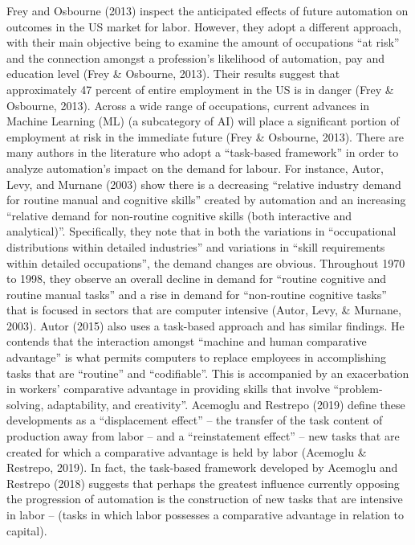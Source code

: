 \documentclass[12pt]{article}
\begin{document}
\begin{flushleft}
\break
\linebreak
Frey and Osbourne (2013) inspect the anticipated effects of future automation on outcomes in the US market for labor. However, they adopt a different approach, with their main objective being to examine the amount of occupations ``at risk” and the connection amongst a profession's likelihood of automation, pay and education level (Frey \& Osbourne, 2013). Their results suggest that approximately 47 percent of entire employment in the US is in danger (Frey \& Osbourne, 2013). Across a wide range of occupations, current advances in Machine Learning (ML) (a subcategory of AI) will place a significant portion of employment at risk in the immediate future (Frey \& Osbourne, 2013).
\break
\linebreak
There are many authors in the literature who adopt a ``task-based framework” in order to analyze automation’s impact on the demand for labour. For instance, Autor, Levy, and Murnane (2003) show there is a decreasing ``relative industry demand for routine manual and cognitive skills” created by automation and an increasing ``relative demand for non-routine cognitive skills (both interactive and analytical)”. Specifically, they note that in both the variations in ``occupational distributions within detailed industries” and variations in ``skill requirements within detailed occupations”, the demand changes are obvious. Throughout 1970 to 1998, they observe an overall decline in demand for ``routine cognitive and routine manual tasks” and a rise in demand for ``non-routine cognitive tasks” that is focused in sectors that are computer intensive (Autor, Levy, \& Murnane, 2003).
\break
\linebreak
Autor (2015) also uses a task-based approach and has similar findings. He contends that the interaction amongst ``machine and human comparative advantage” is what permits computers to replace employees in accomplishing tasks that are “routine” and ``codifiable”. This is accompanied by an exacerbation in workers’ comparative advantage in providing skills that involve ``problem-solving, adaptability, and creativity”. Acemoglu and Restrepo (2019) define these developments as a ``displacement effect” – the transfer of the task content of production away from labor – and a “reinstatement effect” – new tasks that are created for which a comparative advantage is held by labor (Acemoglu \& Restrepo, 2019). In fact, the task-based framework developed by Acemoglu and Restrepo (2018) suggests that perhaps the greatest influence currently opposing the progression of automation is the construction of new tasks that are intensive in labor – (tasks in which labor possesses a comparative advantage in relation to capital).

\end{flushleft}
\end{document}
